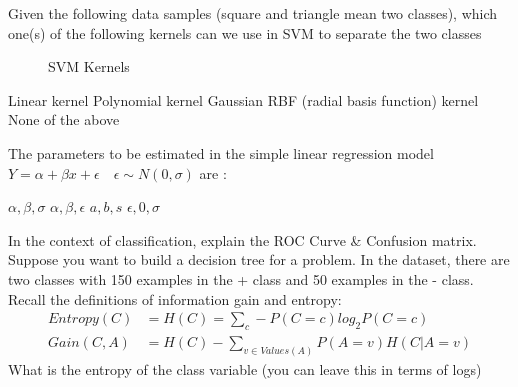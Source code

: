 \documentclass[12pt]{exam}
\begin{document}
\begin{questions}
{%
\renewcommand*\thechoice{\arabic{choice}} 
\renewcommand*\choicelabel{\thechoice)}
%
\question[1] Given the following data samples (square and triangle mean two classes), which one(s) of the following kernels can we use in SVM to separate the two classes \\
\begin{figure}[h]
\centering
{}
\caption{SVM Kernels}
\end{figure}
\begin{multicols}{2}
\begin{choices}
\choice Linear kernel %
\choice Polynomial kernel %
\choice Gaussian RBF (radial basis function) kernel %
\choice None of the above %
\end{choices}
\end{multicols}
}%

{%
\renewcommand*\thechoice{\arabic{choice}} 
\renewcommand*\choicelabel{\thechoice)}
%
\question[1] The parameters to be estimated in the simple linear regression model $Y = \alpha + \beta x + \epsilon \quad \epsilon \sim N(0,\sigma)$ are :\\
\begin{multicols}{2}
\begin{choices}
\choice $\alpha , \beta, \sigma$
\choice $\alpha , \beta, \epsilon$
\choice $a , b, s$
\choice $\epsilon , 0, \sigma$
\end{choices}
\end{multicols}
}%
\question[5]
In the context of classification, explain the ROC Curve \& Confusion matrix.
\makeemptybox{3in}
\question[5] Suppose you want to build a decision tree for a problem. In the dataset, there are two classes with 150 examples in the + class and 50 examples in the - class.\\
Recall the definitions of information gain and entropy:
\begin{align*}
Entropy(C) &= H(C) = \sum_c - P(C=c)log_2P(C=c) \\
Gain(C,A) &= H(C) - \sum_{v \in Values(A)} P(A=v) H(C|A=v)
\end{align*}
What is the entropy of the class variable (you can leave this in terms of logs)
\makeemptybox{1.5in}


\end{questions}
\end{document}

